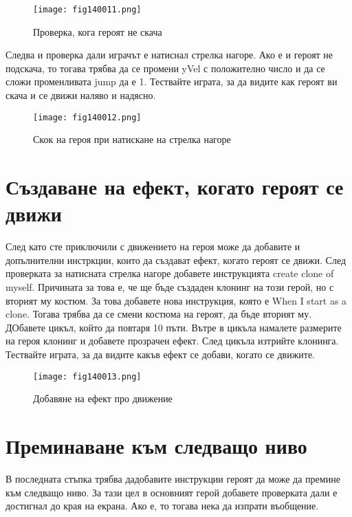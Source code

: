 \begin{figure}[H]
  \centering
  \texttt{[image: fig140011.png]}
  \caption{Проверка, кога героят не скача}
\label{fig140011}
\end{figure}

Следва и проверка дали играчът е натиснал стрелка нагоре. Ако е и героят не подскача, то тогава трябва да се промени yVel с положително число и да се сложи променливата jump да е 1. Тествайте играта, за да видите как героят ви скача и се движи наляво и надясно.

\begin{figure}[H]
  \centering
  \texttt{[image: fig140012.png]}
  \caption{Скок на героя при натискане на стрелка нагоре}
\label{fig140012}
\end{figure}

\section{Създаване на ефект, когато героят се движи}

След като сте приключили с движението на героя може да добавите и допълнителни инстркции, които да създават ефект, когато героят се движи. След проверката за натисната стрелка нагоре добавете инструкцията create clone of myself. Причината за това е, че ще бъде създаден клонинг на този герой, но с вторият му костюм. За това добавете нова инструкция, която е When I start as a clone. Тогава трябва да се смени костюма на героят, да бъде вторият му. ДОбавете цикъл, който да повтаря 10 пъти. Вътре в цикъла намалете размерите на героя клонинг и добавете прозрачен ефект. След цикъла изтрийте клонинга. Тествайте играта, за да видите какъв ефект се добави, когато се движите.

\begin{figure}[H]
  \centering
  \texttt{[image: fig140013.png]}
  \caption{Добавяне на ефект про движение}
\label{fig140013}
\end{figure}

\section{Преминаване към следващо ниво}

В последната стъпка трябва дадобавите инструкции героят да може да премине към следващо ниво. За тази цел в основният герой добавете проверката дали е достигнал до края на екрана. Ако е, то тогава нека да изпрати въобщение.

